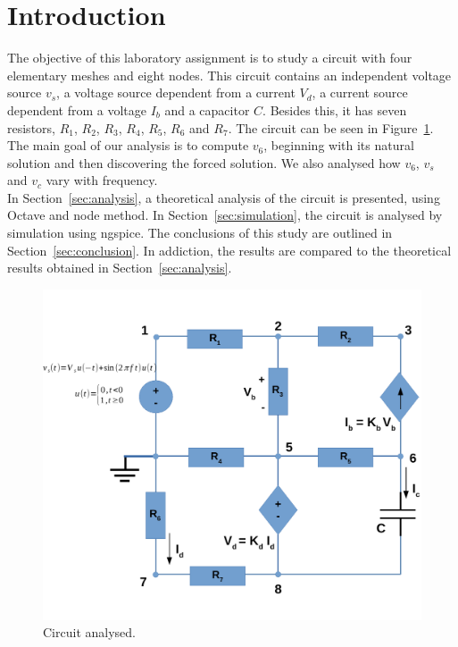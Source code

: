 \newpage
\section{Introduction}
\label{sec:introduction}

The objective of this laboratory assignment is to study a circuit with four elementary meshes and eight nodes. 
This circuit contains an independent voltage source $v_s$, a voltage source dependent from a current $V_d$,
a current source dependent from a voltage $I_b$ and a capacitor $C$. 
Besides this, it has seven resistors, $R_1$, $R_2$, $R_3$, $R_4$, $R_5$, $R_6$ and $R_7$. The circuit can be seen in Figure~\ref{fig:Circuit}.\\
The main goal of our analysis is to compute $v_6$, beginning with its natural solution and then discovering the forced solution. 
We also analysed how $v_6$, $v_s$ and $v_c$ vary with frequency.\\
In Section~\ref{sec:analysis}, a theoretical analysis of the circuit is
presented, using Octave and node method. In Section~\ref{sec:simulation}, the circuit is analysed by
simulation using ngspice. The conclusions of this study are outlined in
Section~\ref{sec:conclusion}. In addiction, the results are compared to the theoretical results obtained in
Section~\ref{sec:analysis}.

\begin{figure}[h!] \centering
\includegraphics[width=0.6\linewidth]{Circuit.pdf}
\caption{Circuit analysed.}
\label{fig:Circuit}
\end{figure}

